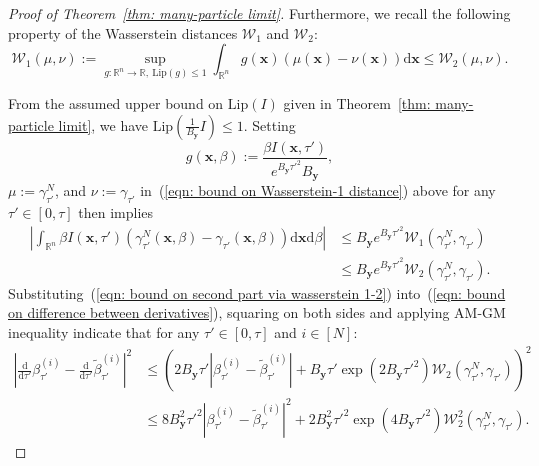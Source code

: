 \documentclass{article}
\numberwithin{equation}{section}
\def\eqref#1{(\ref{#1})}
\newcommand{\dif}{{\mathrm{d}}}
\def\vx{{\bm{x}}}
\def\vy{{\bm{y}}}
\def\gW{{\mathcal{W}}}
\begin{document}
\begin{proof}[Proof of Theorem~\ref{thm: many-particle limit}]
    Furthermore, we recall the following property of the Wasserstein distances $\gW_1$ and $\gW_2$:
    \begin{equation}
    \label{eqn: bound on Wasserstein-1 distance}
    \gW_{1}(\mu,\nu) := \sup_{g:\mathbb{R}^n \rightarrow \mathbb{R}, \ \mathrm{Lip}(g) \leq 1}\int_{\mathbb{R}^n}g(\vx)\left(\mu(\vx)-\nu(\vx)\right)\dif\vx \leq \gW_{2}(\mu,\nu).
    \end{equation}

    From the assumed upper bound on $\mathrm{Lip}\left(I\right)$ given in Theorem~\ref{thm: many-particle limit}, we have $\mathrm{Lip}\left(\frac{1}{B_{\vy}}I\right) \leq 1$. Setting $$g(\vx,\beta):=\frac{\beta I(\vx,\tau')}{e^{B_{\vy}\tau'^2}B_{\vy}},$$ $\mu:=\gamma^N_{\tau'}$, and $\nu:=\gamma_{\tau'}$ in~\eqref{eqn: bound on Wasserstein-1 distance} above for any $\tau' \in [0,\tau]$ then implies
    \begin{equation}
    \label{eqn: bound on second part via wasserstein 1-2}
    \begin{aligned}
    \left|\int_{\mathbb{R}^{n}}\beta I\left(\vx,\tau'\right)\left(\gamma^N_{\tau'}(\vx,\beta) - \gamma_{\tau'}(\vx,\beta)\right)\dif\vx\dif\beta\right| &\leq B_{\vy}e^{B_{\vy}\tau'^2}\gW_1\left(\gamma^N_{\tau'},\gamma_{\tau'}\right) \\
    &\leq B_{\vy}e^{B_{\vy}\tau'^2}\gW_2\left(\gamma^N_{\tau'},\gamma_{\tau'}\right).
    \end{aligned}    
    \end{equation}
    Substituting~\eqref{eqn: bound on second part via wasserstein 1-2} into~\eqref{eqn: bound on difference between derivatives}, squaring on both sides and applying AM-GM inequality indicate that for any $\tau' \in [0,\tau]$ and $i \in [N]$:
    \begin{equation}
    \begin{aligned}
    \left|\frac{\dif}{\dif \tau'}\beta^{(i)}_{\tau'} - \frac{\dif}{\dif \tau'}\widetilde{\beta}^{(i)}_{\tau'}\right|^2 &\leq  \left(2B_{\vy}\tau'\left|\beta^{(i)}_{\tau'} - \widetilde{\beta}^{(i)}_{\tau'}\right| + B_{\vy}\tau'\exp\left(2B_{\vy}\tau'^2\right)\gW_2\left(\gamma^N_{\tau'},\gamma_{\tau'}\right)\right)^2 \\
    &\leq 8B_{\vy}^2\tau'^2\left|\beta^{(i)}_{\tau'} - \widetilde{\beta}^{(i)}_{\tau'}\right|^2 + 2B_{\vy}^2\tau'^2\exp\left(4B_{\vy}\tau'^2\right)\gW^2_2\left(\gamma^N_{\tau'},\gamma_{\tau'}\right).
    \end{aligned}    
    \end{equation}


\end{proof}
\end{document}
